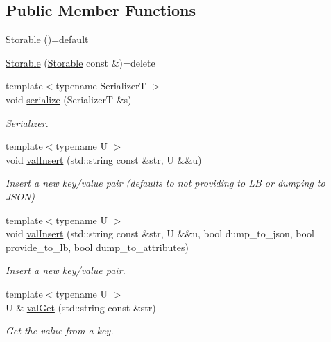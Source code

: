 \subsection*{Public Member Functions}
\begin{DoxyCompactItemize}
\item 
\hyperlink{structvt_1_1vrt_1_1collection_1_1storage_1_1_storable_aa6cb609d17c3fffd1416842cf9cc27e9}{Storable} ()=default
\item 
\hyperlink{structvt_1_1vrt_1_1collection_1_1storage_1_1_storable_a5a3e15eefa62b57645c73b06a0ffcbea}{Storable} (\hyperlink{structvt_1_1vrt_1_1collection_1_1storage_1_1_storable}{Storable} const \&)=delete
\item 
{\footnotesize template$<$typename SerializerT $>$ }\\void \hyperlink{structvt_1_1vrt_1_1collection_1_1storage_1_1_storable_a9fac390a50e3de2776afb730dd3c0418}{serialize} (SerializerT \&s)
\begin{DoxyCompactList}\small\item\em Serializer. \end{DoxyCompactList}\item 
{\footnotesize template$<$typename U $>$ }\\void \hyperlink{structvt_1_1vrt_1_1collection_1_1storage_1_1_storable_a8c0cbce1b3e261dd375d431a56a7c350}{val\+Insert} (std\+::string const \&str, U \&\&u)
\begin{DoxyCompactList}\small\item\em Insert a new key/value pair (defaults to not providing to LB or dumping to J\+S\+ON) \end{DoxyCompactList}\item 
{\footnotesize template$<$typename U $>$ }\\void \hyperlink{structvt_1_1vrt_1_1collection_1_1storage_1_1_storable_a192398855fe40d939d86126f33d68a58}{val\+Insert} (std\+::string const \&str, U \&\&u, bool dump\+\_\+to\+\_\+json, bool provide\+\_\+to\+\_\+lb, bool dump\+\_\+to\+\_\+attributes)
\begin{DoxyCompactList}\small\item\em Insert a new key/value pair. \end{DoxyCompactList}\item 
{\footnotesize template$<$typename U $>$ }\\U \& \hyperlink{structvt_1_1vrt_1_1collection_1_1storage_1_1_storable_a81a60463dff73c6375422344c8eb410c}{val\+Get} (std\+::string const \&str)
\begin{DoxyCompactList}\small\item\em Get the value from a key. \end{DoxyCompactList}\item 

\end{DoxyCompactItemize}
